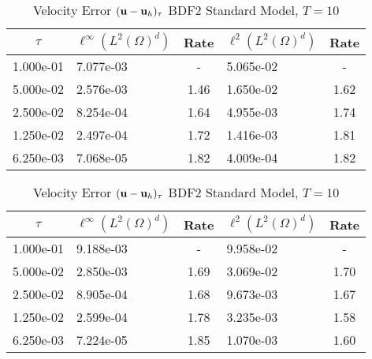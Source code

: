 \documentclass[letterpaper]{erdc}
\begin{document}
\begin{table}[h!]
  \parbox{.45\linewidth}{
  \tiny
  \centering
    \caption{Velocity Error $(\textbf{u} - \textbf{u}_h)_{\tau}$ BDF2 Rotational Model, $T=10$}
    \begin{tabular}{c|l|c|l|c}
      $\tau$ &  $\ell^{\infty}\left(L^2(\Omega)^d\right)$ &  Rate  &  $\ell^2\left(L^2(\Omega)^d\right)$  &  Rate\\
      \hline
      1.000e-01 & 7.077e-03 &  -   & 5.065e-02 &  -  \\
      5.000e-02 & 2.576e-03 & 1.46 & 1.650e-02 & 1.62\\
      2.500e-02 & 8.254e-04 & 1.64 & 4.955e-03 & 1.74\\
      1.250e-02 & 2.497e-04 & 1.72 & 1.416e-03 & 1.81\\
      6.250e-03 & 7.068e-05 & 1.82 & 4.009e-04 & 1.82
    \end{tabular}
    }
    \hfill
    \parbox{.45\linewidth}{
    \tiny
    \centering
      \caption{Velocity Error $(\textbf{u} - \textbf{u}_h)_{\tau}$ BDF2 Standard Model, $T=10$}
      \begin{tabular}{c|l|c|l|c}
        $\tau$ &  $\ell^{\infty}\left(L^2(\Omega)^d\right)$ &  Rate  &  $\ell^2\left(L^2(\Omega)^d\right)$  &  Rate\\
        \hline
        1.000e-01 & 9.188e-03 &  -   & 9.958e-02 &  -  \\
        5.000e-02 & 2.850e-03 & 1.69 & 3.069e-02 & 1.70\\
        2.500e-02 & 8.905e-04 & 1.68 & 9.673e-03 & 1.67\\
        1.250e-02 & 2.599e-04 & 1.78 & 3.235e-03 & 1.58\\
        6.250e-03 & 7.224e-05 & 1.85 & 1.070e-03 & 1.60
      \end{tabular}
    }
\end{table}
\end{document}
